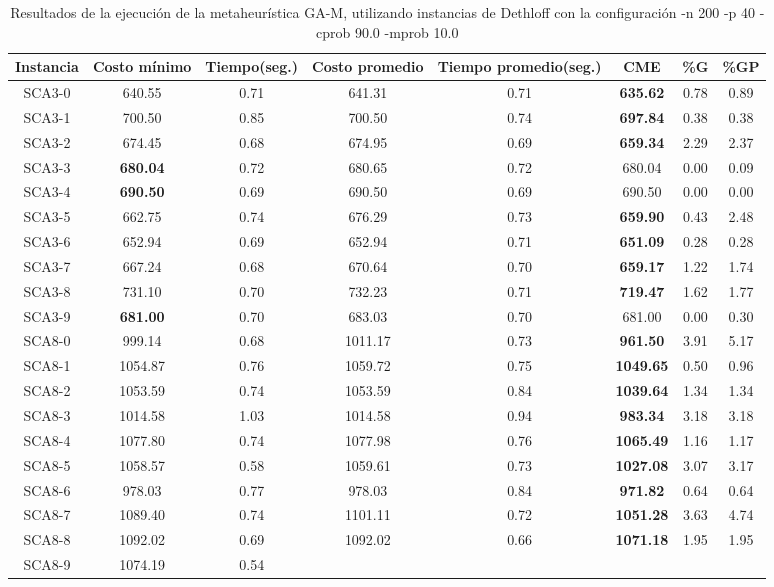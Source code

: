 \begin{table}[ht]
\caption{Resultados de la ejecución de la metaheurística GA-M, utilizando instancias de Dethloff con la configuración -n 200 -p 40 -cprob 90.0 -mprob 10.0}
\centering
\small
\begin{tabular}{c c c c c c c c}
\hline\hline
Instancia & Costo mínimo & Tiempo(seg.) & Costo promedio & Tiempo promedio(seg.) & CME & \%G & \%GP \\ [0.5ex]
\hline
SCA3-0 & 640.55 & 0.71 & 
641.31 & 0.71 & \bf{635.62} & 
0.78 & 0.89\\SCA3-1 & 700.50 & 0.85 & 
700.50 & 0.74 & \bf{697.84} & 
0.38 & 0.38\\SCA3-2 & 674.45 & 0.68 & 
674.95 & 0.69 & \bf{659.34} & 
2.29 & 2.37\\SCA3-3 & \bf{680.04} & 0.72 & 
680.65 & 0.72 & 680.04 & 0.00
 & 0.09\\SCA3-4 & \bf{690.50} & 0.69 & 
690.50 & 0.69 & 690.50 & 0.00
 & 0.00\\
SCA3-5 & 662.75 & 0.74 & 
676.29 & 0.73 & \bf{659.90} & 
0.43 & 2.48\\SCA3-6 & 652.94 & 0.69 & 
652.94 & 0.71 & \bf{651.09} & 
0.28 & 0.28\\SCA3-7 & 667.24 & 0.68 & 
670.64 & 0.70 & \bf{659.17} & 
1.22 & 1.74\\SCA3-8 & 731.10 & 0.70 & 
732.23 & 0.71 & \bf{719.47} & 
1.62 & 1.77\\SCA3-9 & \bf{681.00} & 0.70 & 
683.03 & 0.70 & 681.00 & 0.00
 & 0.30\\SCA8-0 & 999.14 & 0.68 & 
1011.17 & 0.73 & \bf{961.50} & 
3.91 & 5.17\\SCA8-1 & 1054.87 & 0.76 & 
1059.72 & 0.75 & \bf{1049.65} & 
0.50 & 0.96\\SCA8-2 & 1053.59 & 0.74 & 
1053.59 & 0.84 & \bf{1039.64} & 
1.34 & 1.34\\SCA8-3 & 1014.58 & 1.03 & 
1014.58 & 0.94 & \bf{983.34} & 
3.18 & 3.18\\SCA8-4 & 1077.80 & 0.74 & 
1077.98 & 0.76 & \bf{1065.49} & 
1.16 & 1.17\\SCA8-5 & 1058.57 & 0.58 & 
1059.61 & 0.73 & \bf{1027.08} & 
3.07 & 3.17\\SCA8-6 & 978.03 & 0.77 & 
978.03 & 0.84 & \bf{971.82} & 
0.64 & 0.64\\SCA8-7 & 1089.40 & 0.74 & 
1101.11 & 0.72 & \bf{1051.28} & 
3.63 & 4.74\\SCA8-8 & 1092.02 & 0.69 & 
1092.02 & 0.66 & \bf{1071.18} & 
1.95 & 1.95\\SCA8-9 & 1074.19 & 0.54 & 

\end{tabular}
\end{table}

